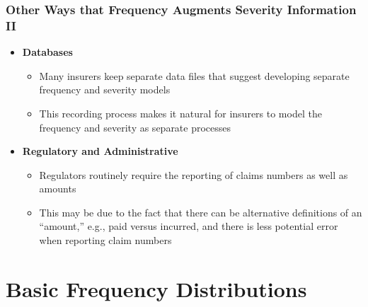 \documentclass{beamer}
\begin{document}
\begin{frame}[shrink=2]%
 \frametitle{Other Ways that Frequency Augments Severity Information II}
\begin{itemize}
     \item \textbf{Databases}
   \begin{itemize}
   \item Many insurers keep separate data files that suggest developing separate frequency and severity
   models \vspace{2mm}
   \item This recording process makes it natural for insurers to model the frequency and severity as separate
   processes \vspace{4mm}
 \end{itemize}
   \item \textbf{Regulatory and Administrative}
   \begin{itemize}
     \item Regulators routinely require the reporting of claims numbers as well as
     amounts \vspace{2mm}
     \item This may be due to the fact that there can be alternative definitions of an ``amount,'' e.g., paid versus incurred, and there is less potential error when reporting claim numbers
  \end{itemize}  \end{itemize}
\end{frame}

\section{Basic Frequency Distributions}
\end{document}
